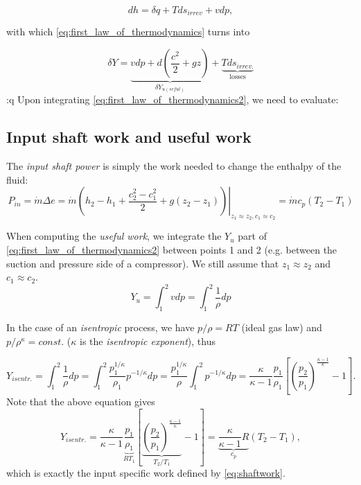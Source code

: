 \begin{equation}
dh=\delta q + T d s_{irrev} + vdp,
\end{equation}

\noindent with which \eqref{eq:first_law_of_thermodynamics} turns into

\begin{equation}
\boxed{\delta Y =\underbrace{vdp+d\left(\frac{c^2}{2}+gz\right)}_{\delta Y_{u(seful)}}
+\underbrace{T d s_{irrev.}}_{\text{losses}}}
\label{eq:first_law_of_thermodynamics2}
\end{equation}
:q
Upon integrating \eqref{eq:first_law_of_thermodynamics2}, we need to evaluate:

\subsection{Input shaft work and useful work}

The \emph{input shaft power} is simply the work needed to change the enthalpy of the fluid:
\begin{equation}
P_{in}=\dot{m} \Delta e = \left.\dot{m} \left( h_2-h_1 + \frac{c_2^2-c_1^2}{2} + g(z_2-z_1)\right)\right|_{z_1\approx z_2, c_1\approx c_2}=\dot{m} c_p \left(T_2-T_1\right)
\label{eq:shaftwork}
\end{equation}

When computing the \emph{useful work}, we integrate the $Y_u$ part of \eqref{eq:first_law_of_thermodynamics2} between points 1 and 2 (e.g. between the suction and pressure side of a compressor). We still assume that $z_1\approx z_2$ and $c_1 \approx c_2$.
\begin{equation}
Y_u = \int_1^2 v dp = \int_1^2 \frac{1}{\rho} dp
\end{equation}

In the case of an \emph{isentropic} process, we have $p/\rho=RT$ (ideal gas law) and $p/\rho^\kappa=const.$ ($\kappa$ is the \emph{isentropic exponent}), thus

\begin{equation}
Y_{isentr.}= \int_1^2 \frac{1}{\rho} dp = \int_1^2 \frac{p_1^{1/\kappa}}{\rho_1} p^{-1/\kappa}dp = \frac{p_1^{1/\kappa}}{\rho}\int_1^2 p^{-1/\kappa} dp = \frac{\kappa}{\kappa-1}\frac{p_1}{\rho_1} \left[\left(\frac{p_2}{p_1}\right)^{\frac{\kappa-1}{\kappa}}-1\right].
\end{equation}
%
Note that the above equation gives
\begin{equation}
Y_{isentr.}= \frac{\kappa}{\kappa-1}\underbrace{\frac{p_1}{\rho_1}}_{R T_1} \left[\underbrace{\left(\frac{p_2}{p_1}\right)^{\frac{\kappa-1}{\kappa}}}_{T_2/T_1}-1\right] = \underbrace{\frac{\kappa}{\kappa-1} R }_{c_p}\left(T_2-T_1\right),
\end{equation}
%
which is exactly the input specific work defined by \eqref{eq:shaftwork}.

